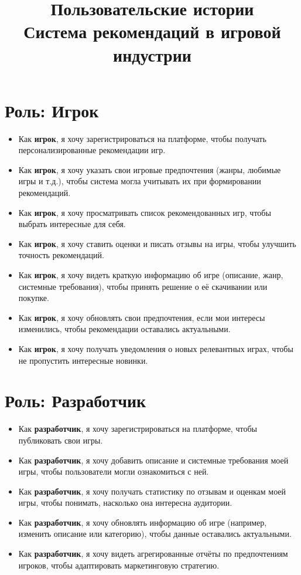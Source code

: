 \documentclass[a4paper,12pt]{article}
\title{
Пользовательские истории\\[0.5em]
\large Система рекомендаций в игровой индустрии
}
\date{}
\begin{document}
\maketitle

\section{Роль: Игрок}

\begin{itemize}[leftmargin=2cm]
    \item Как \textbf{игрок}, я хочу зарегистрироваться на платформе, чтобы получать персонализированные рекомендации игр.
    \item Как \textbf{игрок}, я хочу указать свои игровые предпочтения (жанры, любимые игры и т.д.), чтобы система могла учитывать их при формировании рекомендаций.
    \item Как \textbf{игрок}, я хочу просматривать список рекомендованных игр, чтобы выбрать интересные для себя.
    \item Как \textbf{игрок}, я хочу ставить оценки и писать отзывы на игры, чтобы улучшить точность рекомендаций.
    \item Как \textbf{игрок}, я хочу видеть краткую информацию об игре (описание, жанр, системные требования), чтобы принять решение о её скачивании или покупке.
    \item Как \textbf{игрок}, я хочу обновлять свои предпочтения, если мои интересы изменились, чтобы рекомендации оставались актуальными.
    \item Как \textbf{игрок}, я хочу получать уведомления о новых релевантных играх, чтобы не пропустить интересные новинки.
\end{itemize}

\section{Роль: Разработчик}

\begin{itemize}[leftmargin=2cm]
    \item Как \textbf{разработчик}, я хочу зарегистрироваться на платформе, чтобы публиковать свои игры.
    \item Как \textbf{разработчик}, я хочу добавить описание и системные требования моей игры, чтобы пользователи могли ознакомиться с ней.
    \item Как \textbf{разработчик}, я хочу получать статистику по отзывам и оценкам моей игры, чтобы понимать, насколько она интересна аудитории.
    \item Как \textbf{разработчик}, я хочу обновлять информацию об игре (например, изменить описание или категорию), чтобы данные оставались актуальными.
    \item Как \textbf{разработчик}, я хочу видеть агрегированные отчёты по предпочтениям игроков, чтобы адаптировать маркетинговую стратегию.
\end{itemize}
\end{document}
